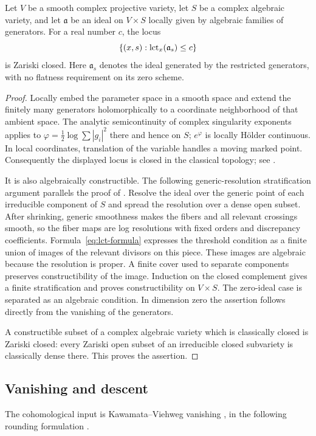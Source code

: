 \begin{lemma}\label{lem:lct-family}
Let $V$ be a smooth complex projective variety, let $S$ be a complex
algebraic variety, and let $\mathfrak a$ be an ideal on $V\times S$
locally given by algebraic families of generators. For a real number
$c$, the locus
\[
 \{(x,s):\operatorname{lct}_x(\mathfrak a_s)\leq c\}
\]
is Zariski closed. Here $\mathfrak a_s$ denotes the ideal generated
by the restricted generators, with no flatness requirement on its
zero scheme.
\end{lemma}
\begin{proof}
Locally embed the parameter space in a smooth space and extend the
finitely many generators holomorphically to a coordinate neighborhood
of that ambient space. The analytic semicontinuity of complex
singularity exponents applies to
$\varphi=\tfrac12\log\sum |g_i|^2$ there and hence on $S$;
$e^{\varphi}$ is locally H\"older continuous. In local coordinates,
translation of the variable handles a moving marked point.
Consequently the displayed locus is closed in the classical
topology; see \cite[Lemma~3.2]{dk2001}.

It is also algebraically constructible. The following generic-resolution
stratification argument parallels the proof of
\cite[Theorem~3.1]{dk2001}. Resolve the ideal over the
generic point of each irreducible component of $S$ and spread the
resolution over a dense open subset. After shrinking, generic
smoothness makes the fibers and all relevant crossings smooth, so
the fiber maps are log resolutions with fixed orders and
discrepancy coefficients. Formula~\eqref{eq:lct-formula} expresses
the threshold condition as a finite union of images of the
relevant divisors on this piece. These images are algebraic because
the resolution is proper. A finite cover used to separate
components preserves constructibility of the image. Induction on
the closed complement gives a finite stratification and proves
constructibility on $V\times S$. The zero-ideal case is separated
as an algebraic condition. In dimension zero the assertion follows
directly from the vanishing of the generators.

A constructible subset of a complex algebraic variety which is
classically closed is Zariski closed: every Zariski open subset of
an irreducible closed subvariety is classically dense there. This
proves the assertion.
\end{proof}

\subsection{Vanishing and descent}
The cohomological input is Kawamata--Viehweg vanishing
\cite{kawamata1982,viehweg1982}, in the following rounding formulation
\cite[Theorem~0.1]{fujinoKV}.

